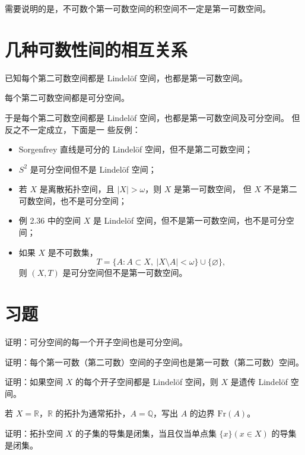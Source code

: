 需要说明的是，不可数个第一可数空间的积空间不一定是第一可数空间。
\section{几种可数性间的相互关系}
已知每个第二可数空间都是 Lindelöf 空间，也都是第一可数空间。

\begin{theorem}[2.52]
每个第二可数空间都是可分空间。
\end{theorem}
于是每个第二可数空间都是 Lindelöf 空间，也都是第一可数空间及可分空间。  
但反之不一定成立，下面是一 些反例：

\begin{itemize}
  \item[(1)] Sorgenfrey 直线是可分的 Lindelöf 空间，但不是第二可数空间；
  \item[(2)] $S^2$ 是可分空间但不是 Lindelöf 空间；
  \item[(3)] 若 $X$ 是离散拓扑空间，且 $|X|>\omega$，则 $X$ 是第一可数空间，
  但 $X$ 不是第二可数空间，也不是可分空间；
  \item[(4)] 例 2.36 中的空间 $X$ 是 Lindelöf 空间，但不是第一可数空间，也不是可分空间；
  \item[(5)] 如果 $X$ 是不可数集，
  \[
  T=\{A:A\subset X,\ |X\setminus A|<\omega\}\cup\{\varnothing\},
  \]
  则 $(X,T)$ 是可分空间但不是第一可数空间。
\end{itemize}
\newpage
\section{习题}
\begin{exercise}
证明：可分空间的每一个开子空间也是可分空间。
\end{exercise}

\begin{exercise}
证明：每个第一可数（第二可数）空间的子空间也是第一可数（第二可数）空间。
\end{exercise}

\begin{exercise}
证明：如果空间 $X$ 的每个开子空间都是 Lindelöf 空间，则 $X$ 是遗传 Lindelöf 空间。
\end{exercise}

\begin{exercise}
若 $X=\mathbb{R}$，$\mathbb{R}$ 的拓扑为通常拓扑，$A=\mathbb{Q}$，写出 $A$ 的边界 $\mathrm{Fr}(A)$。
\end{exercise}

\begin{exercise}
证明：拓扑空间 $X$ 的子集的导集是闭集，当且仅当单点集 $\{x\}(x\in X)$ 的导集是闭集。
\end{exercise}

